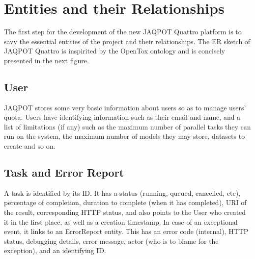 \section{Entities and their Relationships}

The first step for the development of the new JAQPOT Quattro
platform is to savy the essential entities of the project
and their relationships.
The ER sketch of JAQPOT Quattro is inspirited by the OpenTox
ontology and is concisely presented in the next figure.

\subsection{User}
JAQPOT stores some very basic information about users so as to
manage users' quota. Users have identifying information such as 
their email and name, and a list of limitations (if any) such 
as the maximum number of parallel tasks they can run on the system,
the maximum number of models they may store, datasets to create and
so on.

\subsection{Task and Error Report}
A task is identified by its ID. It has a status (running, queued,
cancelled, etc), percentage of completion, duration to complete (when
it has completed), URI of the result, corresponding HTTP status, 
and also points to the User who created it in the first place, 
as well as a creation timestamp. In case of an exceptional 
event, it links to an ErrorReport entity. This has an error code
(internal), HTTP status, debugging details, error message, 
actor (who is to blame for the exception), and an identifying ID.

